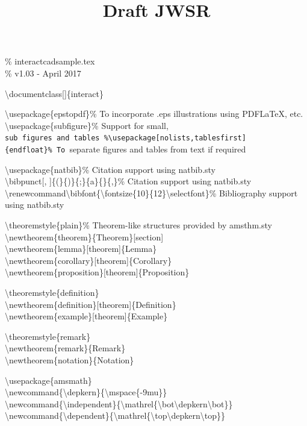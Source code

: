 \documentclass[
]{article}
\title{Draft JWSR}
\author{}
\date{}
\begin{document}
\maketitle

\% interactcadsample.tex\\
\% v1.03 - April 2017

\textbackslash documentclass{[}{]}\{interact\}

\textbackslash usepackage\{epstopdf\}\% To incorporate .eps
illustrations using PDFLaTeX, etc.\\
\textbackslash usepackage\{subfigure\}\% Support for small,
\texttt{sub\textquotesingle{}\ figures\ and\ tables\ \%\textbackslash{}usepackage{[}nolists,tablesfirst{]}\{endfloat\}\%\ To\ }separate\textquotesingle{}
figures and tables from text if required

\textbackslash usepackage\{natbib\}\% Citation support using
natbib.sty\\
\textbackslash bibpunct{[}, {]}\{(\}\{)\}\{;\}\{a\}\{\}\{,\}\% Citation
support using natbib.sty\\
\textbackslash renewcommand\textbackslash bibfont\{\textbackslash fontsize\{10\}\{12\}\textbackslash selectfont\}\%
Bibliography support using natbib.sty

\textbackslash theoremstyle\{plain\}\% Theorem-like structures provided
by amsthm.sty\\
\textbackslash newtheorem\{theorem\}\{Theorem\}{[}section{]}\\
\textbackslash newtheorem\{lemma\}{[}theorem{]}\{Lemma\}\\
\textbackslash newtheorem\{corollary\}{[}theorem{]}\{Corollary\}\\
\textbackslash newtheorem\{proposition\}{[}theorem{]}\{Proposition\}

\textbackslash theoremstyle\{definition\}\\
\textbackslash newtheorem\{definition\}{[}theorem{]}\{Definition\}\\
\textbackslash newtheorem\{example\}{[}theorem{]}\{Example\}

\textbackslash theoremstyle\{remark\}\\
\textbackslash newtheorem\{remark\}\{Remark\}\\
\textbackslash newtheorem\{notation\}\{Notation\}

\textbackslash usepackage\{amsmath\}\\
\textbackslash newcommand\{\textbackslash depkern\}\{\textbackslash mspace\{-9mu\}\}\\
\textbackslash newcommand\{\textbackslash independent\}\{\textbackslash mathrel\{\textbackslash bot\textbackslash depkern\textbackslash bot\}\}\\
\textbackslash newcommand\{\textbackslash dependent\}\{\textbackslash mathrel\{\textbackslash top\textbackslash depkern\textbackslash top\}\}
\end{document}
